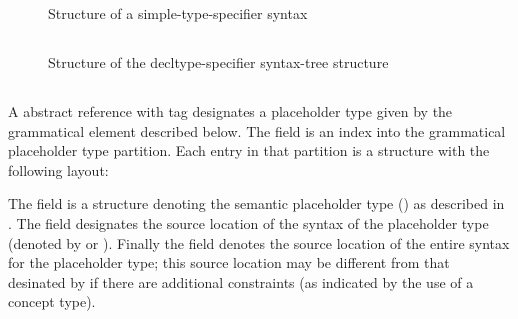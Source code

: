\begin{figure}[H]
	\centering
	\caption{Structure of a simple-type-specifier syntax}
	\label{fig:ifc:SyntaxSort:SimpleTypeSpecifier}
\end{figure}


\subsection{}
\label{sec:ifc:SyntaxSort:DecltypeSpecifier}

\begin{figure}[H]
	\centering
	\caption{Structure of the decltype-specifier syntax-tree structure}
	\label{fig:ifc:SyntaxSort:DecltypeSpecifier}
\end{figure}


\subsection{}
\label{sec:ifc:SyntaxSort:PlaceholderTypeSpecifier}

A  abstract reference with tag 
designates a placeholder type given by the grammatical element described below.
The  field is an index into the grammatical placeholder type 
partition.  Each entry in that partition is a structure with the following
layout:
%
\begin{figure}[H]
	\centering
	\label{fig:ifc:SyntaxSort:PlaceholderTypeSpecifier}
\end{figure}
%
The  field is a structure denoting the semantic placeholder type
 () as described in .  The  field
designates the source location of the syntax of the placeholder type
(denoted by  or ).  Finally the  field
denotes the source location of the entire syntax for the placeholder type;
this source location may be different from that desinated by 
if there are additional constraints (as indicated by the use of a concept type).

